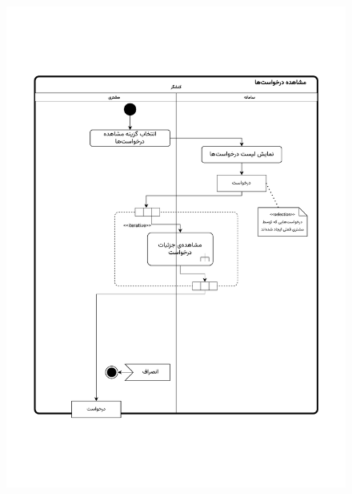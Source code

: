 \begin{figure}[ht!]
	\centering
	\includegraphics[scale=0.8, page=1]{figs/OOD-activity-viewreq.pdf}
\end{figure}
\FloatBarrier
\newpage

